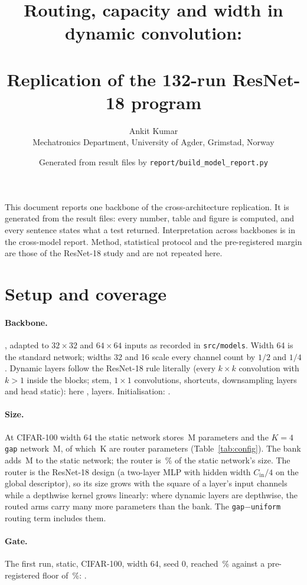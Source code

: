 \documentclass[10pt,a4paper]{article}
\title{\vspace{-1.3cm}\textbf{Routing, capacity and width in dynamic convolution:\\ \V{modelname}}\\[3pt]
\large Replication of the 132-run ResNet-18 program}
\author{Ankit Kumar\\\small Mechatronics Department, University of Agder, Grimstad, Norway}
\date{\small Generated from result files by \texttt{report/build\_model\_report.py}}
\begin{document}
\maketitle
\vspace{-0.4cm}

\noindent This document reports one backbone of the cross-architecture
replication. It is generated from the result files: every number, table
and figure is computed, and every sentence states what a test returned.
Interpretation across backbones is in the cross-model report. Method,
statistical protocol and the pre-registered margin are those of the
ResNet-18 study and are not repeated here.

\section{Setup and coverage}\label{sec:setup}

\paragraph{Backbone.} , adapted to $32\times32$ and
$64\times64$ inputs as recorded in \texttt{src/models}. Width 64 is the
standard network; widths 32 and 16 scale every channel count by $1/2$
and $1/4$. Dynamic layers follow the ResNet-18 rule literally (every
$k\times k$ convolution with $k>1$ inside the blocks; stem, $1\times1$
convolutions, shortcuts, downsampling layers and head static): here
,  layers. Initialisation: .

\paragraph{Size.} At CIFAR-100 width 64 the static network stores
\,M parameters and the $K=4$ \texttt{gap} network
\,M, of which \,K are router parameters
(Table~\ref{tab:config}). The bank adds \,M to the static
network; the router is \,\% of the static network's size.
The router is the ResNet-18 design (a two-layer MLP with hidden width
$C_{\text{in}}/4$ on the global descriptor), so its size grows with the
square of a layer's input channels while a depthwise kernel grows
linearly: where dynamic layers are depthwise, the routed arms carry many
more parameters than the bank. The \texttt{gap}$-$\texttt{uniform}
routing term includes them.

\paragraph{Gate.} The first run, static, CIFAR-100, width 64, seed 0,
reached \,\% against a pre-registered floor of
\,\%: .
\end{document}
